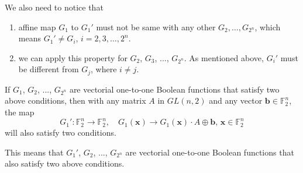 \documentclass{article}
\newcommand{\FF}{\mathbb{F}}
\begin{document}
We also need to notice that

\begin{enumerate}
    \item affine map $G_1$ to $G_1'$ must not be same with any other $G_2, \ldots, G_{2^n}$, which means $G_1' \neq G_i$, $i = 2, 3, \ldots, 2^n$.
    \item we can apply this property for $G_2$, $G_3$, ..., $G_{2^n}$. As mentioned above, $G_i'$ must be different from $G_j$, where $i \neq j$.
\end{enumerate}

\begin{remark}
    If $G_1$, $G_2$, ..., $G_{2^n}$ are vectorial one-to-one Boolean functions that satisfy two above conditions, then with any matrix $A$ in $GL(n, 2)$ and any vector $\bm{b} \in \FF_2^n$, the map \[ G_1': \FF_2^n \to \FF_2^n, \quad G_1(\bm{x}) \to G_1(\bm{x}) \cdot A \oplus \bm{b},\, \bm{x} \in \FF_2^n \] will also satisfy two conditions.

    This means that $G_1'$, $G_2$, ..., $G_{2^n}$ are vectorial one-to-one Boolean functions that also satisfy two above conditions.
\end{remark}
\end{document}
